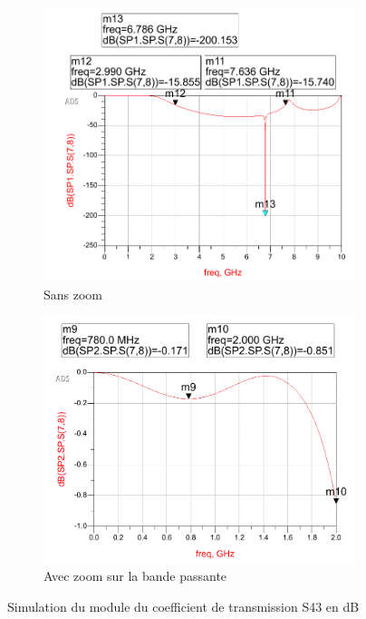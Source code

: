 \documentclass[french]{article}
\begin{document}
\begin{figure}[H]
	\centering
	\begin{subfigure}[b]{0.49\textwidth}
		\includegraphics[width=\textwidth]{photo/passe_bas_vic/simu_passe_bas_distribue_ameliore.PNG}
		\caption{Sans zoom}
		\label{fig:simu_passe_bas_distribue_amelioreG}
	\end{subfigure}
	\begin{subfigure}[b]{0.49\textwidth}
		\includegraphics[width=\textwidth]{photo/passe_bas_vic/simu_zoom_passe_bas_distribue_ameliore.PNG}
		\caption{Avec zoom sur la bande passante}
		\label{fig:simu_zoom_passe_bas_distribue_ameliore}
	\end{subfigure}
	\caption{Simulation du module du coefficient de transmission S43 en dB}
	\label{fig:simu_passe_bas_distribue_ameliore}
\end{figure}
\end{document}
